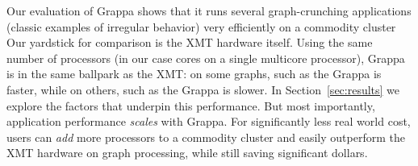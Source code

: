 % 
% 

Our evaluation of Grappa shows that it runs several graph-crunching applications (classic examples of irregular behavior) very efficiently on a commodity cluster  Our yardstick for comparison is the XMT hardware itself.  Using the same number of processors (in our case cores on a single multicore processor), Grappa is in the same ballpark as the XMT: on some graphs, such as the  Grappa is  faster, while on others, such as the  Grappa is  slower.  In Section~\ref{sec:results} we explore the factors that underpin this performance.  But most importantly, application performance \emph{scales} with Grappa.  For significantly less real world cost, users can \emph{add} more processors to a commodity cluster and easily outperform the XMT hardware on graph processing, while still saving significant dollars.
% 




